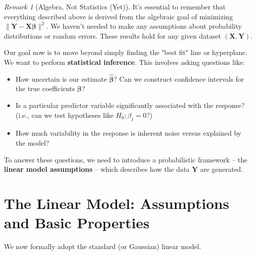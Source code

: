 \documentclass[11pt, letterpaper]{article}
\theoremstyle{definition}
\theoremstyle{plain} %
\theoremstyle{remark}
\newtheorem{remark}[definition]{Remark}     %
\newcommand{\vb}[1]{\bm{#1}}          %
\newcommand{\mb}[1]{\bm{#1}}          %
\newcommand{\Yvec}{\vb{Y}}            %
\newcommand{\Xmat}{\mb{X}}            %
\newcommand{\betavec}{\vb{\beta}}     %
\newcommand{\betahatvec}{\vb{\hat{\beta}}}%
\begin{document}
\begin{remark}[Algebra, Not Statistics (Yet)]
It's essential to remember that everything described above is derived from the algebraic goal of minimizing $\|\Yvec - \Xmat\betavec\|^2$. We haven't needed to make any assumptions about probability distributions or random errors. These results hold for any given dataset $(\Xmat, \Yvec)$.
\end{remark}

Our goal now is to move beyond simply finding the "best fit" line or hyperplane. We want to perform \textbf{statistical inference}. This involves asking questions like:
\begin{itemize}
    \item How uncertain is our estimate $\betahatvec$? Can we construct confidence intervals for the true coefficients $\betavec$?
    \item Is a particular predictor variable significantly associated with the response? (i.e., can we test hypotheses like $H_0: \beta_j = 0$?)
    \item How much variability in the response is inherent noise versus explained by the model?
\end{itemize}
To answer these questions, we need to introduce a probabilistic framework – the \textbf{linear model assumptions} – which describes how the data $\Yvec$ are generated.

\section{The Linear Model: Assumptions and Basic Properties}

We now formally adopt the standard (or Gaussian) linear model.
\end{document}
